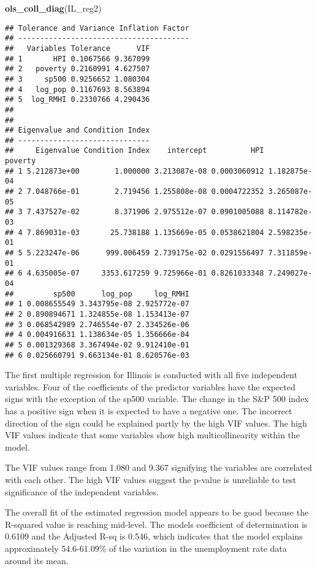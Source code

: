 \documentclass[
]{article}
\newenvironment{Shaded}{\begin{snugshade}}{\end{snugshade}}
\newcommand{\KeywordTok}[1]{\textcolor[rgb]{0.13,0.29,0.53}{\textbf{#1}}}
\newcommand{\NormalTok}[1]{#1}
\begin{document}
\begin{Shaded}
\begin{Highlighting}[]
\KeywordTok{ols_coll_diag}\NormalTok{(IL_reg2)}
\end{Highlighting}
\end{Shaded}

\begin{verbatim}
## Tolerance and Variance Inflation Factor
## ---------------------------------------
##   Variables Tolerance      VIF
## 1       HPI 0.1067566 9.367099
## 2   poverty 0.2160991 4.627507
## 3     sp500 0.9256652 1.080304
## 4   log_pop 0.1167693 8.563894
## 5  log_RMHI 0.2330766 4.290436
## 
## 
## Eigenvalue and Condition Index
## ------------------------------
##     Eigenvalue Condition Index    intercept          HPI      poverty
## 1 5.212873e+00        1.000000 3.213087e-08 0.0003060912 1.182875e-04
## 2 7.048766e-01        2.719456 1.255808e-08 0.0004722352 3.265087e-05
## 3 7.437527e-02        8.371906 2.975512e-07 0.0901005088 8.114782e-03
## 4 7.869031e-03       25.738188 1.135669e-05 0.0538621804 2.598235e-01
## 5 5.223247e-06      999.006459 2.739175e-02 0.0291556497 7.311859e-01
## 6 4.635005e-07     3353.617259 9.725966e-01 0.8261033348 7.249027e-04
##         sp500      log_pop     log_RMHI
## 1 0.008655549 3.343795e-08 2.925772e-07
## 2 0.890894671 1.324855e-08 1.153413e-07
## 3 0.068542989 2.746554e-07 2.334526e-06
## 4 0.004916631 1.138634e-05 1.356666e-04
## 5 0.001329368 3.367494e-02 9.912410e-01
## 6 0.025660791 9.663134e-01 8.620576e-03
\end{verbatim}

The first multiple regression for Illinois is conducted with all five
independent variables. Four of the coefficients of the predictor
variables have the expected signs with the exception of the sp500
variable. The change in the S\&P 500 index has a positive sign when it
is expected to have a negative one. The incorrect direction of the sign
could be explained partly by the high VIF values. The high VIF values
indicate that some variables show high multicollinearity within the
model.

The VIF values range from 1.080 and 9.367 signifying the variables are
correlated with each other. The high VIF values suggest the p-value is
unreliable to test significance of the independent variables.

The overall fit of the estimated regression model appears to be good
because the R-squared value is reaching mid-level. The models
coefficient of determination is 0.6109 and the Adjusted R-sq is 0.546,
which indicates that the model explains approximately 54.6-61.09\% of
the variation in the unemployment rate data around its mean.
\end{document}
